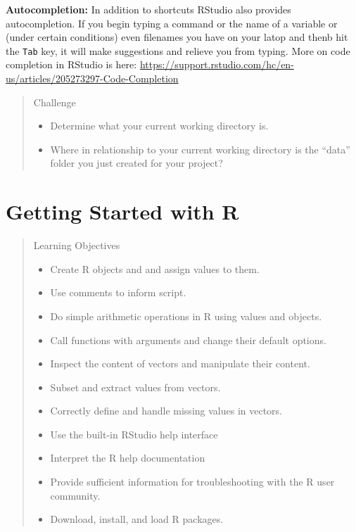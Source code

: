 \documentclass[
]{book}
\providecommand{\tightlist}{%
  \setlength{\itemsep}{0pt}\setlength{\parskip}{0pt}}
\begin{document}
\textbf{Autocompletion:} In addition to shortcuts RStudio also provides autocompletion. If you begin typing a command or the name of a variable or (under certain conditions) even filenames you have on your latop and thenb hit the \texttt{Tab} key, it will make suggestions and relieve you from typing. More on code completion in RStudio is here: \url{https://support.rstudio.com/hc/en-us/articles/205273297-Code-Completion}

\begin{quote}
Challenge

\begin{itemize}
\tightlist
\item
  Determine what your current working directory is.
\item
  Where in relationship to your current working directory is the ``data'' folder you just created for your project?
\end{itemize}
\end{quote}

\chapter{Getting Started with R}\label{gettingstarted}

\begin{quote}
Learning Objectives

\begin{itemize}
\tightlist
\item
  Create R objects and and assign values to them.
\item
  Use comments to inform script.
\item
  Do simple arithmetic operations in R using values and objects.
\item
  Call functions with arguments and change their default options.
\item
  Inspect the content of vectors and manipulate their content.
\item
  Subset and extract values from vectors.
\item
  Correctly define and handle missing values in vectors.
\item
  Use the built-in RStudio help interface
\item
  Interpret the R help documentation
\item
  Provide sufficient information for troubleshooting with the R user community.
\item
  Download, install, and load R packages.
\end{itemize}
\end{quote}
\end{document}
